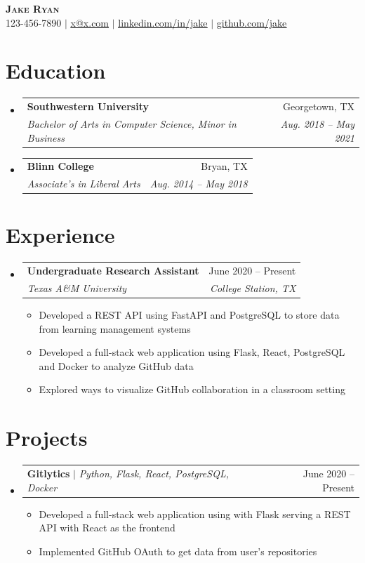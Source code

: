 \documentclass[letterpaper,11pt]{article}
\makeatletter
\newcommand{\resumeItem}[1]{
  \item\small{
    {#1 \vspace{-2pt}}
  }
}
\newcommand{\resumeSubheading}[4]{
  \vspace{-2pt}\item
    \begin{tabular*}{0.97\textwidth}[t]{l@{\extracolsep{\fill}}r}
      \textbf{#1} & #2 \\
      \textit{\small#3} & \textit{\small #4} \\
    \end{tabular*}\vspace{-7pt}
}
\newcommand{\resumeProjectHeading}[2]{
    \item
    \begin{tabular*}{0.97\textwidth}{l@{\extracolsep{\fill}}r}
      \small#1 & #2 \\
    \end{tabular*}\vspace{-7pt}
}
\newcommand{\resumeSubHeadingListStart}{\begin{itemize}[leftmargin=0.15in, label={}]}
\newcommand{\resumeSubHeadingListEnd}{\end{itemize}}
\newcommand{\resumeItemListStart}{\begin{itemize}}
\newcommand{\resumeItemListEnd}{\end{itemize}\vspace{-5pt}}
\makeatother
\begin{document}
\begin{center}
    \textbf{\Huge \scshape Jake Ryan} \\ \vspace{1pt}
    \small 123-456-7890 $|$ \href{mailto:x@x.com}{\underline{x@x.com}} $|$
    \href{https://linkedin.com/in/...}{\underline{linkedin.com/in/jake}} $|$
    \href{https://github.com/...}{\underline{github.com/jake}}
\end{center}


\section{Education}
  \resumeSubHeadingListStart
    \resumeSubheading
      {Southwestern University}{Georgetown, TX}
      {Bachelor of Arts in Computer Science, Minor in Business}{Aug. 2018 -- May 2021}
    \resumeSubheading
      {Blinn College}{Bryan, TX}
      {Associate's in Liberal Arts}{Aug. 2014 -- May 2018}
  \resumeSubHeadingListEnd


\section{Experience}
  \resumeSubHeadingListStart

    \resumeSubheading
      {Undergraduate Research Assistant}{June 2020 -- Present}
      {Texas A\&M University}{College Station, TX}
      \resumeItemListStart
        \resumeItem{Developed a REST API using FastAPI and PostgreSQL to store data from learning management systems}
        \resumeItem{Developed a full-stack web application using Flask, React, PostgreSQL and Docker to analyze GitHub data}
        \resumeItem{Explored ways to visualize GitHub collaboration in a classroom setting}
      \resumeItemListEnd

  \resumeSubHeadingListEnd


\section{Projects}
    \resumeSubHeadingListStart
      \resumeProjectHeading
          {\textbf{Gitlytics} $|$ \emph{Python, Flask, React, PostgreSQL, Docker}}{June 2020 -- Present}
          \resumeItemListStart
            \resumeItem{Developed a full-stack web application using with Flask serving a REST API with React as the frontend}
            \resumeItem{Implemented GitHub OAuth to get data from user's repositories}
          \resumeItemListEnd
    \resumeSubHeadingListEnd
\end{document}
